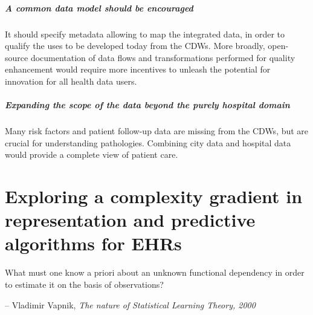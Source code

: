 \documentclass[french,12pt,twoside,a4paper]{book}
\newenvironment{citationbox}{
  \begin{tcolorbox}[
      enhanced,
      colback=gray!10, %
      colframe=white, %
      arc=0mm, %
      boxrule=0.5pt, %
      rightrule=0pt, %
      left=0pt, %
      right=0pt, %
      top=0pt, %
      bottom=0pt, %
      rightupper=0mm, %
      rightlower=0mm, %
      width=0.9\textwidth,
      flush right,
    ]
    \footnotesize %
    \itshape %
    }{
  \end{tcolorbox}%
}
\begin{document}
\paragraph{A common data model should be encouraged} It should specify metadata allowing to map
the integrated data, in order to qualify the uses to be developed today from the
CDWs. More broadly, open-source documentation of data flows and transformations
performed for quality enhancement would require more incentives to unleash the
potential for innovation for all health data users.

\paragraph{Expanding the scope of the data beyond the purely hospital domain}
Many risk factors and patient follow-up data are missing from the CDWs, but are
crucial for understanding pathologies. Combining city data and hospital data
would provide a complete view of patient care.


\chapter{Exploring a complexity gradient in representation and predictive algorithms for EHRs}\label{chapter:predictive_models}

\begin{citationbox}
  What must one know a priori about an unknown functional dependency in order to
  estimate it on the basis of observations?
  \par\hfill -- Vladimir Vapnik, \textit{The nature of Statistical Learning Theory, 2000}
\end{citationbox}
\end{document}
